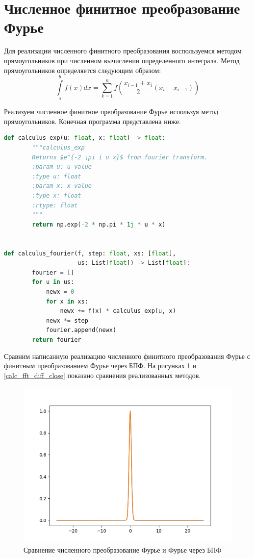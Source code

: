 \section{Численное финитное преобразование Фурье}
{
    Для реализации численного финитного преобразования воспользуемся методом прямоугольников при численном вычислении определенного интеграла.
    Метод прямоугольников определяется следующим образом:
    \begin{equation}
        \int\limits_a^b{f(x)dx} = \sum_{k=1}^{n}{f\left(\dfrac{x_{i-1} + x_i}{2}(x_i - x_{i-1}) \right)} 
    \end{equation}
    
    Реализуем численное финитное преобразование Фурье используя метод прямоугольников. Конечная программа представлена ниже.
    \begin{lstlisting}[frame=single,language=Python,mathescape=true] 
def calculus_exp(u: float, x: float) -> float:
        """calculus_exp
        Returns $e^{-2 \pi i u x}$ from fourier transform.
        :param u: u value
        :type u: float
        :param x: x value
        :type x: float
        :rtype: float
        """
        return np.exp(-2 * np.pi * 1j * u * x)


def calculus_fourier(f, step: float, xs: [float],
                     us: List[float]) -> List[float]:
        fourier = []
        for u in us:
            newx = 0
            for x in xs:
                newx += f(x) * calculus_exp(u, x)
            newx *= step
            fourier.append(newx)
        return fourier

    	\end{lstlisting}
    	
    	Сравним написанную реализацию численного финитного преобразования Фурье с финитным преобразованием Фурье через БПФ.
    	На рисунках \ref{calc_fft_diff} и \ref{calc_fft_diff_close} показано сравнения реализованных методов.
    	
    	\begin{figure}[H]
       \centering
            \includegraphics[width=\textwidth,height=\textheight,keepaspectratio]{calc_fft_diff.png}
            \caption{Сравнение численного преобразование Фурье и Фурье через БПФ}
            \label{calc_fft_diff}
    \end{figure}
    
}
